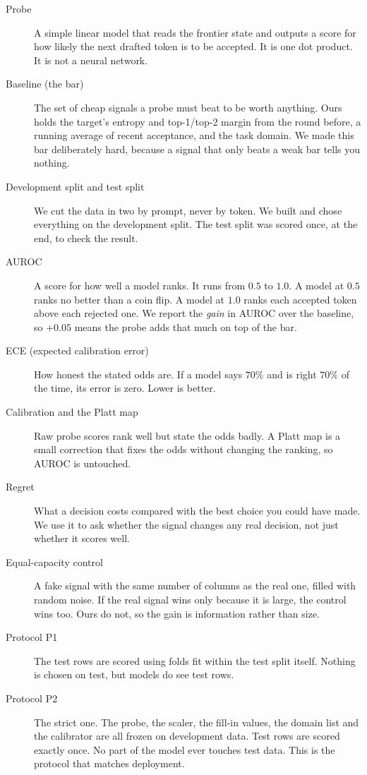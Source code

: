 \documentclass[11pt]{article}
\begin{document}
\begin{description}
\item[Probe] A simple linear model that reads the frontier state and outputs a
score for how likely the next drafted token is to be accepted. It is one dot
product. It is not a neural network.

\item[Baseline (the bar)] The set of cheap signals a probe must beat to be
worth anything. Ours holds the target's entropy and top-1/top-2 margin from the
round before, a running average of recent acceptance, and the task domain. We
made this bar deliberately hard, because a signal that only beats a weak bar
tells you nothing.

\item[Development split and test split] We cut the data in two by prompt, never
by token. We built and chose everything on the development split. The test
split was scored once, at the end, to check the result.

\item[AUROC] A score for how well a model ranks. It runs from $0.5$ to $1.0$.
A model at $0.5$ ranks no better than a coin flip. A model at $1.0$ ranks each
accepted token above each rejected one. We report the \emph{gain} in AUROC
over the baseline, so $+0.05$ means the probe adds that much on top of the bar.

\item[ECE (expected calibration error)] How honest the stated odds are. If a
model says $70\%$ and is right $70\%$ of the time, its error is zero. Lower is
better.

\item[Calibration and the Platt map] Raw probe scores rank well but state the
odds badly. A Platt map is a small correction that fixes the odds without
changing the ranking, so AUROC is untouched.

\item[Regret] What a decision costs compared with the best choice you could
have made. We use it to ask whether the signal changes any real decision, not
just whether it scores well.

\item[Equal-capacity control] A fake signal with the same number of columns as
the real one, filled with random noise. If the real signal wins only because it
is large, the control wins too. Ours do not, so the gain is information rather
than size.

\item[Protocol P1] The test rows are scored using folds fit within the test
split itself. Nothing is chosen on test, but models do see test rows.

\item[Protocol P2] The strict one. The probe, the scaler, the fill-in values,
the domain list and the calibrator are all frozen on development data. Test
rows are scored exactly once. No part of the model ever touches test data. This
is the protocol that matches deployment.

\end{description}
\end{document}
